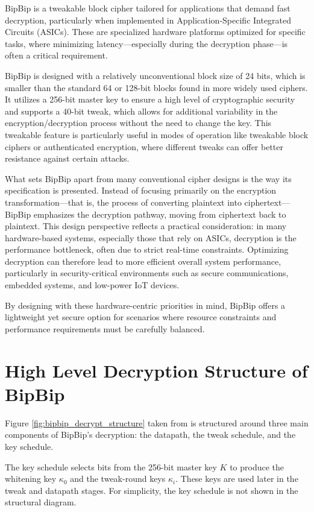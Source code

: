 BipBip is a tweakable block cipher tailored for applications that demand fast decryption, particularly when implemented in Application-Specific Integrated Circuits (ASICs). These are specialized hardware platforms optimized for specific tasks, where minimizing latency—especially during the decryption phase—is often a critical requirement.

BipBip is designed with a relatively unconventional block size of 24 bits, which is smaller than the standard 64 or 128-bit blocks found in more widely used ciphers. It utilizes a 256-bit master key to ensure a high level of cryptographic security and supports a 40-bit tweak, which allows for additional variability in the encryption/decryption process without the need to change the key. This tweakable feature is particularly useful in modes of operation like tweakable block ciphers or authenticated encryption, where different tweaks can offer better resistance against certain attacks.

What sets BipBip apart from many conventional cipher designs is the way its specification is presented. Instead of focusing primarily on the encryption transformation—that is, the process of converting plaintext into ciphertext—BipBip emphasizes the decryption pathway, moving from ciphertext back to plaintext. This design perspective reflects a practical consideration: in many hardware-based systems, especially those that rely on ASICs, decryption is the performance bottleneck, often due to strict real-time constraints. Optimizing decryption can therefore lead to more efficient overall system performance, particularly in security-critical environments such as secure communications, embedded systems, and low-power IoT devices.

By designing with these hardware-centric priorities in mind, BipBip offers a lightweight yet secure option for scenarios where resource constraints and performance requirements must be carefully balanced.

\section{High Level Decryption Structure of BipBip}

Figure \ref{fig:bipbip_decrypt_structure} taken from \cite{Belkheyar_Daemen_Dobraunig_Ghosh_Rasoolzadeh_2022} is structured around three main components of BipBip's decryption: the datapath, the tweak schedule, and the key schedule.

The key schedule selects bits from the 256-bit master key $K$ to produce the whitening key $\kappa_0$ and the tweak-round keys $\kappa_i$. These keys are used later in the tweak and datapath stages. For simplicity, the key schedule is not shown in the structural diagram.

